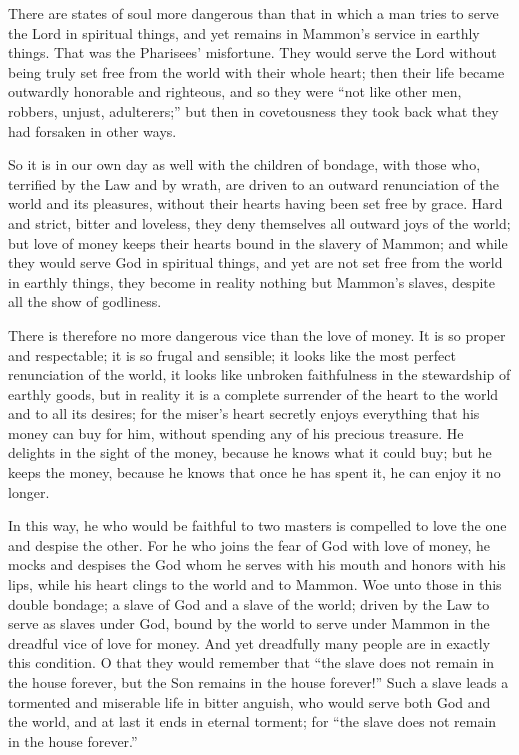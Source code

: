 There are states of soul more dangerous than that in which a man tries to serve the Lord in spiritual things, and yet remains in Mammon’s service in earthly things. That was the Pharisees’ misfortune. They would serve the Lord without being truly set free from the world with their whole heart; then their life became outwardly honorable and righteous, and so they were “not like other men, robbers, unjust, adulterers;” but then in covetousness they took back what they had forsaken in other ways.

So it is in our own day as well with the children of bondage, with those who, terrified by the Law and by wrath, are driven to an outward renunciation of the world and its pleasures, without their hearts having been set free by grace. Hard and strict, bitter and loveless, they deny themselves all outward joys of the world; but love of money keeps their hearts bound in the slavery of Mammon; and while they would serve God in spiritual things, and yet are not set free from the world in earthly things, they become in reality nothing but Mammon’s slaves, despite all the show of godliness.

There is therefore no more dangerous vice than the love of money. It is so proper and respectable; it is so frugal and sensible; it looks like the most perfect renunciation of the world, it looks like unbroken faithfulness in the stewardship of earthly goods, but in reality it is a complete surrender of the heart to the world and to all its desires; for the miser’s heart secretly enjoys everything that his money can buy for him, without spending any of his precious treasure. He delights in the sight of the money, because he knows what it could buy; but he keeps the money, because he knows that once he has spent it, he can enjoy it no longer.

In this way, he who would be faithful to two masters is compelled to love the one and despise the other. For he who joins the fear of God with love of money, he mocks and despises the God whom he serves with his mouth and honors with his lips, while his heart clings to the world and to Mammon. Woe unto those in this double bondage; a slave of God and a slave of the world; driven by the Law to serve as slaves under God, bound by the world to serve under Mammon in the dreadful vice of love for money. And yet dreadfully many people are in exactly this condition. O that they would remember that “the slave does not remain in the house forever, but the Son remains in the house forever!” Such a slave leads a tormented and miserable life in bitter anguish, who would serve both God and the world, and at last it ends in eternal torment; for “the slave does not remain in the house forever.”

